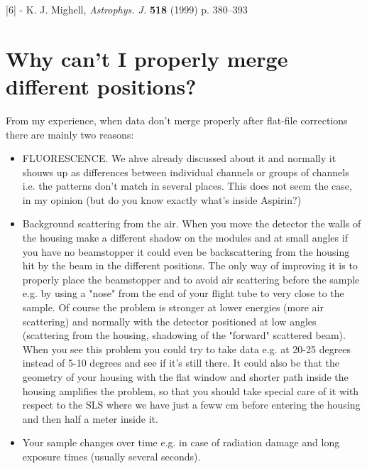 [6] - K. J. Mighell, {\textit{Astrophys. J.}} {\textbf{518}} (1999) p. 380--393























\section{Why can't I properly merge different positions?}

From my experience, when data don't merge properly after flat-file corrections there are mainly two reasons:
\begin{itemize}
\item FLUORESCENCE. We ahve already discussed about it and normally it shouws up as differences between individual channels or groups of channels i.e. the patterns don't match in several places.
This does not seem the case, in my opinion (but do you know exactly what's inside Aspirin?)

\item Background scattering from the air. When you move the detector the walls of the housing make a different shadow on the modules and at small angles if you have no beamstopper it could even be backscattering from the housing hit by the beam in the different positions. The only way of improving it is to properly place the beamstopper and to avoid air scattering before the sample e.g. by using a "nose" from the end of your flight tube to very close to the sample.
Of course the problem is stronger at lower energies (more air scattering) and normally with the detector positioned at low angles (scattering from the housing, shadowing of the "forward" scattered beam).
When you see this problem you could try to take data e.g. at 20-25 degrees instead of 5-10 degrees and see if it's still there.
It could also be that the geometry of your housing with the flat window and shorter path inside the housing amplifies the problem, so that you should take special care of it with respect to the SLS where we have just a feww cm before entering the housing and then half a meter inside it.

\item Your sample changes over time e.g. in case of radiation damage and long exposure times (usually several seconds).

\end{itemize}

